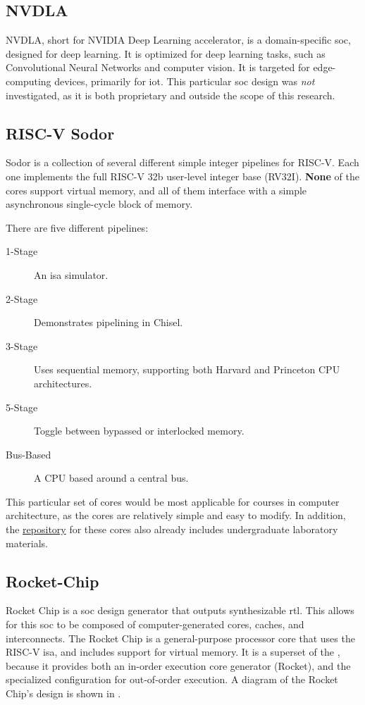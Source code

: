 \subsection{NVDLA}\label{sec:NVDLA_Generator}
\nocite{nvdlaPaper}
\nocite{nvdlaNVIDIAPresentation}
NVDLA, short for NVIDIA Deep Learning \Gls{accelerator}, is a domain-specific \gls{soc}, designed for deep learning.
It is optimized for deep learning tasks, such as Convolutional Neural Networks and computer vision.
It is targeted for edge-computing devices, primarily for \Gls{iot}.
This particular \gls{soc} design was \emph{not} investigated, as it is both proprietary and outside the scope of this research.

\subsection{RISC-V Sodor}\label{sec:RISC-V_Sodor}
\nocite{sodorGithub}
Sodor is a collection of several different simple integer pipelines for RISC-V.
Each one implements the full RISC-V 32b user-level integer base (RV32I).
\textbf{None} of the cores support virtual memory, and all of them interface with a simple asynchronous single-cycle block of memory.

There are five different pipelines:
\begin{description}
\item[1-Stage] An \gls{isa} simulator.
\item[2-Stage] Demonstrates pipelining in Chisel.
\item[3-Stage] Uses sequential memory, supporting both Harvard and Princeton CPU architectures.
\item[5-Stage] Toggle between bypassed or interlocked memory.
\item[Bus-Based] A CPU based around a central bus.
\end{description}

This particular set of cores would be most applicable for courses in computer architecture, as the cores are relatively simple and easy to modify.
In addition, the \href{https://github.com/ucb-bar/riscv-sodor}{repository} for these cores also already includes undergraduate laboratory materials.

\subsection{Rocket-Chip}\label{sec:Rocket_Chip}
\nocite{rocketChipPaper}
\nocite{rocketChipGithub}
Rocket Chip is a \gls{soc} design generator that outputs synthesizable \gls{rtl}.
This allows for this \gls{soc} to be composed of computer-generated cores, caches, and interconnects.
The Rocket Chip is a general-purpose processor core that uses the RISC-V \gls{isa}, and includes support for virtual memory.
It is a superset of the , because it provides both an in-order execution core generator (Rocket), and the specialized  configuration for out-of-order execution.
A diagram of the Rocket Chip's design is shown in .

